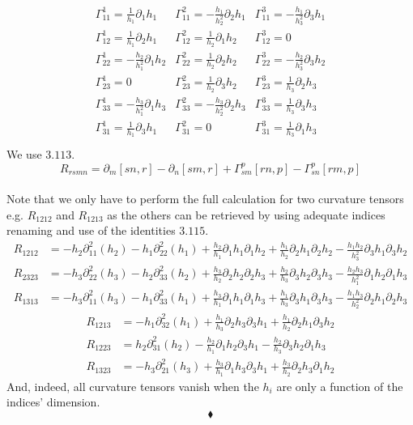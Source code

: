 \begin{align}
\begin{array}{lll}
\Gamma^1_{11}=\frac{1}{h_{1}}\partial_{1}{h_{1}} &\Gamma^2_{11}=-\frac{h_{1}}{h_{2}^2}\partial_{2}{h_{1}}  & \Gamma^3_{11}= -\frac{h_{1}}{h_{3}^2}\partial_{3}{h_{1}}   \\
\Gamma^1_{12}= \frac{1}{h_{1}}\partial_{2}{h_{1}} &\Gamma^2_{12}=\frac{1}{h_{2}}\partial_{1}{h_{2}} & \Gamma^3_{12}=0\\
\Gamma^1_{22}= -\frac{h_{2}}{h_{1}^2}\partial_{1}{h_{2}} &\Gamma^2_{22}=\frac{1}{h_{2}}\partial_{2}{h_{2}} & \Gamma^3_{22}=-\frac{h_{2}}{h_{3}^2}\partial_{3}{h_{2}} \\
\Gamma^1_{23}=0 &\Gamma^2_{23}=\frac{1}{h_{2}}\partial_{3}{h_{2}} & \Gamma^3_{23}= \frac{1}{h_{3}}\partial_{2}{h_{3}}\\
\Gamma^1_{33}= -\frac{h_{3}}{h_{1}^2}\partial_{1}{h_{3}}&\Gamma^2_{33}=-\frac{h_{3}}{h_{2}^2}\partial_{2}{h_{3}} & \Gamma^3_{33}= \frac{1}{h_{3}}\partial_{3}{h_{3}}\\
\Gamma^1_{31}=\frac{1}{h_{1}}\partial_{3}{h_{1}} &\Gamma^2_{31}=0 & \Gamma^3_{31}=\frac{1}{h_{3}}\partial_{1}{h_{3}} \\
\end{array}
\end{align}
We use $3.113.$ $$R_{rsmn}= \partial_m[sn,r] -\partial_n[sm,r]+\Gamma^p_{sm}[rn,p]-\Gamma^p_{sn}[rm,p]$$\\

Note that we only have to perform the full calculation for two curvature tensors e.g. $R_{1212}$ and $R_{1213}$  as the others can be retrieved by using adequate indices renaming and use of the identities $3.115.$
\begin{align}
R_{1212}&=
-h_2\partial_{11}^2(h_2)-h_1\partial_{22}^2(h_1)
+\frac{h_2}{h_1}\partial_1 h_1\partial_1 h_2+\frac{h_1}{h_2}\partial_2 h_1\partial_2 h_2-\frac{h_1 h_2}{h_3^2}\partial_3 h_1\partial_3 h_2\\
R_{2323}&=
-h_3\partial_{22}^2(h_3)-h_2\partial_{33}^2(h_2)
+\frac{h_3}{h_2}\partial_2 h_2\partial_2 h_3+\frac{h_2}{h_3}\partial_3 h_2\partial_3 h_3-\frac{h_2 h_3}{h_1^2}\partial_1 h_2\partial_1 h_3\\
R_{1313}&=
-h_3\partial_{11}^2(h_3)-h_1\partial_{33}^2(h_1)
+\frac{h_3}{h_1}\partial_1 h_1\partial_1 h_3+\frac{h_1}{h_3}\partial_3 h_1\partial_3 h_3-\frac{h_1 h_3}{h_2^2}\partial_2 h_1\partial_2 h_3
\end{align}
\begin{align}
R_{1213}&=-h_1\partial_{32}^2(h_1)+\frac{h_1}{h_3}\partial_2 h_3\partial_3 h_1+\frac{h_1}{h_2}\partial_2 h_1\partial_3 h_2\\
R_{1223}&=h_2\partial_{31}^2(h_2)-\frac{h_2}{h_1}\partial_1 h_2\partial_3 h_1-\frac{h_2}{h_3}\partial_3 h_2\partial_1 h_3\\
R_{1323}&=
-h_3\partial_{21}^2(h_3)+\frac{h_3}{h_1}\partial_1 h_3\partial_3 h_1+\frac{h_3}{h_2}\partial_2 h_3\partial_1 h_2
\end{align}
And, indeed, all curvature tensors vanish when the $h_i$ are only a function of the indices' dimension.
$$\blacklozenge$$
\newpage


